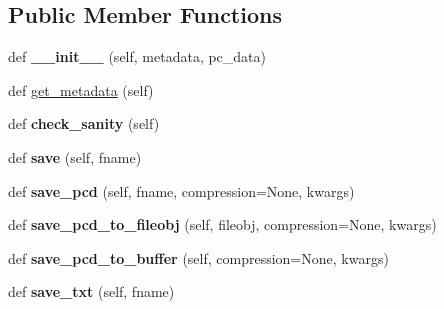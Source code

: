 \subsection*{Public Member Functions}
\begin{DoxyCompactItemize}
\item 
\mbox{\label{classpypcd__hack_1_1pypcd_1_1PointCloud_aa0b66b23d74f05261684c9b4e3478752}} 
def {\bfseries \+\_\+\+\_\+init\+\_\+\+\_\+} (self, metadata, pc\+\_\+data)
\item 
def \hyperlink{classpypcd__hack_1_1pypcd_1_1PointCloud_a58c7a76fe2b5fb28c2cce4f518b4198a}{get\+\_\+metadata} (self)
\item 
\mbox{\label{classpypcd__hack_1_1pypcd_1_1PointCloud_ae1fb8356ddf9c2f674705904dbb4525e}} 
def {\bfseries check\+\_\+sanity} (self)
\item 
\mbox{\label{classpypcd__hack_1_1pypcd_1_1PointCloud_ad9154bffac34b2ff0ccae658e5b083b6}} 
def {\bfseries save} (self, fname)
\item 
\mbox{\label{classpypcd__hack_1_1pypcd_1_1PointCloud_ae8d5ea2137753007df919d08a9052b5d}} 
def {\bfseries save\+\_\+pcd} (self, fname, compression=None, kwargs)
\item 
\mbox{\label{classpypcd__hack_1_1pypcd_1_1PointCloud_a0950ad2664dc1a9f11aa2445f1a0cf57}} 
def {\bfseries save\+\_\+pcd\+\_\+to\+\_\+fileobj} (self, fileobj, compression=None, kwargs)
\item 
\mbox{\label{classpypcd__hack_1_1pypcd_1_1PointCloud_a48cd94a677050c810e2e232b4751ec6c}} 
def {\bfseries save\+\_\+pcd\+\_\+to\+\_\+buffer} (self, compression=None, kwargs)
\item 
\mbox{\label{classpypcd__hack_1_1pypcd_1_1PointCloud_a85ec91e40496cdb1a89580dfd678906a}} 
def {\bfseries save\+\_\+txt} (self, fname)
\item 
\mbox{\label{classpypcd__hack_1_1pypcd_1_1PointCloud_a9ee82d1171c33e80c324904887dc455d}} 

\end{DoxyCompactItemize}
